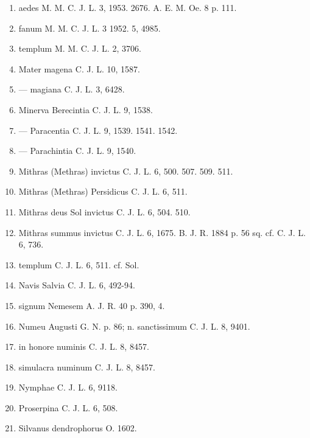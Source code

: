 \documentclass[a4paper, 11pt, oneside, polutonikogreek, german, twocolumn]{article}
\begin{document}
\begin{enumerate}
\item aedes M. M. C. J. L. 3, 1953. 2676. A. E. M. Oe. 8 p. 111.

\item fanum M. M. C. J. L. 3 1952. 5, 4985.

\item templum M. M. C. J. L. 2, 3706.

\item Mater magena C. J. L. 10, 1587.

\item --- magiana C. J. L. 3, 6428.

\item Minerva Berecintia C. J. L. 9, 1538.

\item --- Paracentia C. J. L. 9, 1539. 1541. 1542.

\item --- Parachintia C. J. L. 9, 1540.

\item Mithras (Methras) invictus C. J. L. 6, 500. 507. 509. 511.

\item Mithras (Methras) Persidicus C. J. L. 6, 511.

\item Mithras deus Sol invictus C. J. L. 6, 504. 510.

\item Mithras summus invictus C. J. L. 6, 1675. B. J. R. 1884 p. 56 sq. cf. C. J. L. 6, 736.

\item templum C. J. L. 6, 511. cf. Sol.

\item Navis Salvia C. J. L. 6, 492-94.

\item signum Nemesem A. J. R. 40 p. 390, 4.

\item Numeu Augusti G. N. p. 86; n. sanctissimum C. J. L. 8, 9401.

\item in honore numinis C. J. L. 8, 8457.

\item simulacra numinum C. J. L. 8, 8457.

\item Nymphae C. J. L. 6, 9118.

\item Proserpina C. J. L. 6, 508.

\item Silvanus dendrophorus O. 1602.


\end{enumerate}
\end{document}
